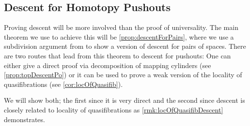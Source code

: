 \subsection*{Descent for Homotopy Pushouts}
Proving descent will be more involved than the proof of universality.
The main theorem we use to achieve this will be \cref{prop:descentForPairs}, where we use a subdivision argument from \cite{may1990weak} to show a version of descent for pairs of spaces.
There are two routes that lead from this theorem to descent for pushouts:
One can either give a direct proof via decomposition of mapping cylinders (see \cref{prop:topDescentPo}) or it can be used to prove a weak version of the locality of quasifibrations (see \cref{cor:locOfQuasifib}).

We will show both; 
the first since it is very direct and the second since descent is closely related to locality of quasifibrations as \cref{rmk:locOfQuasifibDescent} demonstrates.

